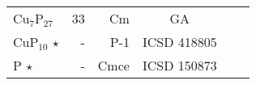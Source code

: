 \begin{tabular}{l r r c l l}
  Cu$_\text{7}$P$_\text{27}$              &          33          &          Cm          &               GA               &                                \\
       CuP$_\text{10}$          $\star$   &          -           &        P-1          &          ICSD 418805           &                                \\
              P                 $\star$   &          -           &        Cmce         &          ICSD 150873           &                                \\
\end{tabular}